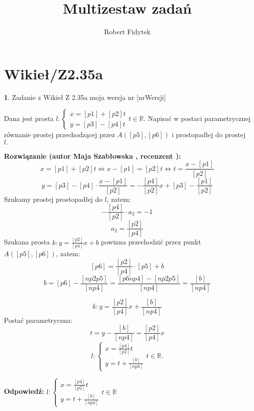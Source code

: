\documentclass[12pt, a4paper]{article}
\title{Multizestaw zadań}
\author{Robert Fidytek}
\date{}
\theoremstyle{definition} %
\newtheorem{zad}{}
\newcommand{\kategoria}[1]{\section{#1}} %
\newcommand{\zadStart}[1]{\begin{zad}#1\newline} %
\newcommand{\zadStop}{\end{zad}}   %
\newcommand{\rozwStart}[2]{\noindent \textbf{Rozwiązanie (autor #1 , recenzent #2): }\newline} %
\newcommand{\rozwStop}{\newline}                                            %
\newcommand{\odpStart}{\noindent \textbf{Odpowiedź:}\newline}    %
\newcommand{\odpStop}{\newline}                                             %
\begin{document}
\maketitle


\kategoria{Wikieł/Z2.35a}
\zadStart{Zadanie z Wikieł Z 2.35a moja wersja nr [nrWersji]}

Dana jest prosta $l:\left\{ \begin{array}{ll}
x=[p1]+[p2]t \\
y=[p3]-[p4]t  
\end{array}\right.  t\in\mathbb{R}.$ Napisać w postaci parametrycznej równanie prostej przechodzącej przez $A([p5],[p6])$ i prostopadłej do prostej $l.$
\zadStop

\rozwStart{Maja Szabłowska}{}
$$x=[p1]+[p2]t \iff x-[p1]=[p2]t \iff t=\frac{x-[p1]}{[p2]}$$
$$ y=[p3]-[p4]\cdot\frac{x-[p1]}{[p2]}=-\frac{[p4]}{[p2]}x+[p3]-\frac{[p1]}{[p2]}$$
Szukamy prostej prostopadłej do $l$, zatem:
$$-\frac{[p4]}{[p2]}\cdot a_{2}=-1$$
$$a_{2}=\frac{[p2]}{[p4]}$$
Szukana prosta $k: y=\frac{[p2]}{[p4]}x+b$ powinna przechodzić przez punkt $A([p5],[p6])$, zatem:
$$[p6]=\frac{[p2]}{[p4]}\cdot[p5]+b$$
$$b=[p6]-\frac{[np2p5]}{[np4]}=\frac{[p6np4]-[np2p5]}{[np4]}=\frac{[b]}{[np4]}$$

$$k: y=\frac{[p2]}{[p4]}x+\frac{[b]}{[np4]}$$
Postać parametryczna:
$$t=y-\frac{[b]}{[np4]}=\frac{[p2]}{[p4]}x$$
$$l:\left\{ \begin{array}{ll}
x=\frac{[p4]}{[p2]}t\\
y=t+\frac{[b]}{[np4]}
\end{array}\right.  t\in\mathbb{R}.$$
\rozwStop


\odpStart
$l:\left\{ \begin{array}{ll}
x=\frac{[p4]}{[p2]}t\\
y=t+\frac{[b]}{[np4]}
\end{array}\right.  t\in\mathbb{R}$
\odpStop
\end{document}
